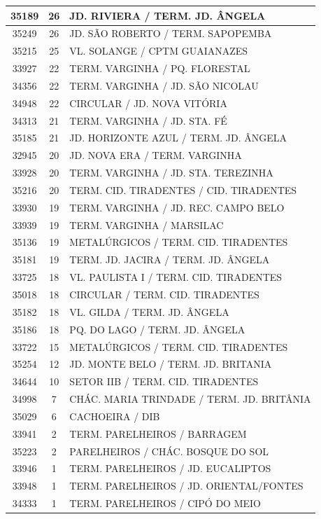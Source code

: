 \documentclass[
	12pt,				%
	oneside,			%
	a4paper,			%
	english,			%
	brazil				%
	]{abntex2ppgsi}
\begin{document}
{{\begin{apendicesenv}
\begin{longtable}{c|c|p{7cm}}
35189 &	26 &	JD. RIVIERA / TERM. JD. ÂNGELA \\ 
 \hline 
35249 &	26 &	JD. SÃO ROBERTO / TERM. SAPOPEMBA \\ 
 \hline 
35215 &	25 &	VL. SOLANGE / CPTM GUAIANAZES \\ 
 \hline 
33927 &	22 &	TERM. VARGINHA / PQ. FLORESTAL \\ 
 \hline 
34356 &	22 &	TERM. VARGINHA / JD. SÃO NICOLAU \\ 
 \hline 
34948 &	22 &	CIRCULAR / JD. NOVA VITÓRIA \\ 
 \hline 
34313 &	21 &	TERM. VARGINHA / JD. STA. FÉ \\ 
 \hline 
35185 &	21 &	JD. HORIZONTE AZUL / TERM. JD. ÂNGELA \\ 
 \hline 
32945 &	20 &	JD. NOVA ERA / TERM. VARGINHA \\ 
 \hline 
33928 &	20 &	TERM. VARGINHA / JD. STA. TEREZINHA \\ 
 \hline 
35216 &	20 &	TERM. CID. TIRADENTES / CID. TIRADENTES \\ 
 \hline 
33930 &	19 &	TERM. VARGINHA / JD. REC. CAMPO BELO \\ 
 \hline 
33939 &	19 &	TERM. VARGINHA / MARSILAC \\ 
 \hline 
35136 &	19 &	METALÚRGICOS / TERM. CID. TIRADENTES \\ 
 \hline 
35181 &	19 &	TERM. JD. JACIRA / TERM. JD. ÂNGELA \\ 
 \hline 
33725 &	18 &	VL. PAULISTA I / TERM. CID. TIRADENTES \\ 
 \hline 
35018 &	18 &	CIRCULAR / TERM. CID. TIRADENTES \\ 
 \hline 
35182 &	18 &	VL. GILDA / TERM. JD. ÂNGELA \\ 
 \hline 
35186 &	18 &	PQ. DO LAGO / TERM. JD. ÂNGELA \\ 
 \hline 
33722 &	15 &	METALÚRGICOS / TERM. CID. TIRADENTES \\ 
 \hline 
35254 &	12 &	JD. MONTE BELO / TERM. JD. BRITANIA \\ 
 \hline 
34644 &	10 &	SETOR IIB / TERM. CID. TIRADENTES \\ 
 \hline 
34998 &	7 &	CHÁC. MARIA TRINDADE / TERM. JD. BRITÂNIA \\ 
 \hline 
35029 &	6 &	CACHOEIRA / DIB \\ 
 \hline 
33941 &	2 &	TERM. PARELHEIROS / BARRAGEM \\ 
 \hline 
35223 &	2 &	PARELHEIROS / CHÁC. BOSQUE DO SOL \\ 
 \hline 
33946 &	1 &	TERM. PARELHEIROS / JD. EUCALIPTOS \\ 
 \hline 
33948 &	1 &	TERM. PARELHEIROS / JD. ORIENTAL/FONTES \\ 
 \hline 
34333 &	1 &	TERM. PARELHEIROS / CIPÓ DO MEIO \\
\hline


\end{longtable}
\end{apendicesenv}}}
\end{document}
